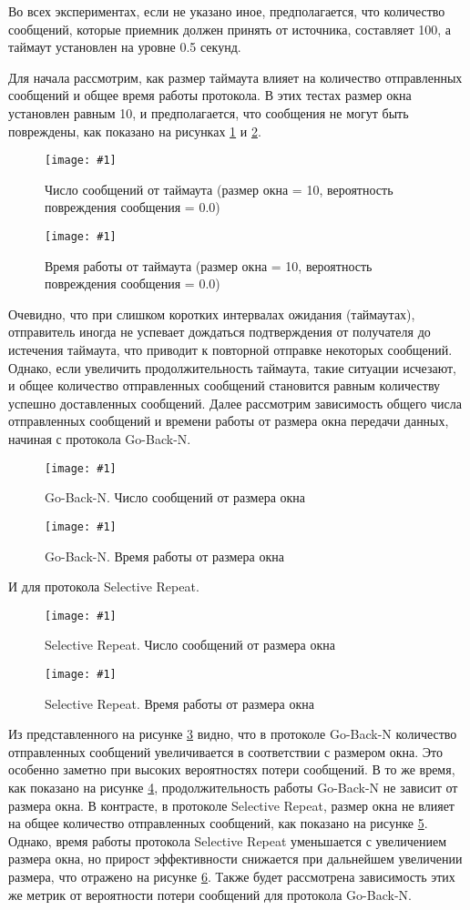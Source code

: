 \documentclass[a4paper,12pt]{article}
\newcommand{\plot}[3]{
    \begin{figure}[H]
        \begin{center}
            \texttt{[image: \#1]}
            \caption{#2}
            \label{#3}
        \end{center}
    \end{figure}
}
\begin{document}
    Во всех экспериментах, если не указано иное, предполагается, что количество сообщений, которые приемник должен принять от источника, составляет 100, а таймаут установлен на уровне 0.5 секунд.

    Для начала рассмотрим, как размер таймаута влияет на количество отправленных сообщений и общее время работы протокола.
    В этих тестах размер окна установлен равным 10, и предполагается, что сообщения не могут быть повреждены, как показано на рисунках \ref{p:timeoutsMessageNum} и \ref{p:timeoutsWorkingTime}.

    \plot{timeoutsMessageNum}{Число сообщений от таймаута (размер окна = 10, вероятность повреждения сообщения = 0.0)}{p:timeoutsMessageNum}
    \plot{timeoutsWorkingTime}{Время работы от таймаута (размер окна = 10, вероятность повреждения сообщения = 0.0)}{p:timeoutsWorkingTime}

    Очевидно, что при слишком коротких интервалах ожидания (таймаутах), отправитель иногда не успевает дождаться подтверждения от получателя до истечения таймаута, что приводит к повторной отправке некоторых сообщений. Однако, если увеличить продолжительность таймаута, такие ситуации исчезают, и общее количество отправленных сообщений становится равным количеству успешно доставленных сообщений.
    Далее рассмотрим зависимость общего числа отправленных сообщений и времени работы от размера окна передачи данных, начиная с протокола Go-Back-N.

    \plot{rateSizeGBNMessageNum}{Go-Back-N. Число сообщений от размера окна}{p:rateSizeGBNMessageNum}
    \plot{rateSizeGBNWorkingTime}{Go-Back-N. Время работы от размера окна}{p:rateSizeGBNWorkingTime}

    И для протокола Selective Repeat.

    \plot{rateSizeSRPMessageNum}{Selective Repeat. Число сообщений от размера окна}{p:rateSizeSRPMessageNum}
    \plot{rateSizeSRPWorkingTime}{Selective Repeat. Время работы от размера окна}{p:rateSizeSRPWorkingTime}

    Из представленного на рисунке \ref{p:rateSizeGBNMessageNum} видно, что в протоколе Go-Back-N количество отправленных сообщений увеличивается в соответствии с размером окна. Это особенно заметно при высоких вероятностях потери сообщений. В то же время, как показано на рисунке \ref{p:rateSizeGBNWorkingTime}, продолжительность работы Go-Back-N не зависит от размера окна. В контрасте, в протоколе Selective Repeat, размер окна не влияет на общее количество отправленных сообщений, как показано на рисунке \ref{p:rateSizeSRPMessageNum}. Однако, время работы протокола Selective Repeat уменьшается с увеличением размера окна, но прирост эффективности снижается при дальнейшем увеличении размера, что отражено на рисунке \ref{p:rateSizeSRPWorkingTime}.
    Также будет рассмотрена зависимость этих же метрик от вероятности потери сообщений для протокола Go-Back-N.
\end{document}
